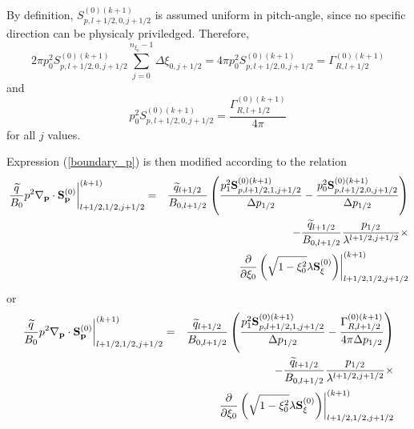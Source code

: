 By definition, $S_{p,l+1/2,0,j+1/2}^{\left( 0\right) \left( k+1\right) }$ is
assumed uniform in pitch-angle, since no specific direction can be physicaly
priviledged. Therefore,
\begin{equation}
2\pi p_{0}^{2}S_{p,l+1/2,0,j+1/2}^{\left( 0\right) \left( k+1\right)
}\sum_{j=0}^{n_{\xi _{0}}-1}\Delta \xi _{0,j+1/2}=4\pi
p_{0}^{2}S_{p,l+1/2,0,j+1/2}^{\left( 0\right) \left( k+1\right) }=\Gamma
_{R,l+1/2}^{\left( 0\right) \left( k+1\right) }
\end{equation}
and
\begin{equation}
p_{0}^{2}S_{p,l+1/2,0,j+1/2}^{\left( 0\right) \left( k+1\right) }=\frac{
\Gamma _{R,l+1/2}^{\left( 0\right) \left( k+1\right) }}{4\pi }
\end{equation}
for all $j$ values.

Expression (\ref{boundary_p}) is then modified according to the relation
\begin{eqnarray}
\left. \frac{\widetilde{q}}{B_{0}}p^{2}\nabla _{\mathbf{p}}\cdot \mathbf{S}_{%
\mathbf{p}}^{\left( 0\right) }\right| _{l+1/2,1/2,j+1/2}^{(k+1)} &=&\frac{%
\widetilde{q}_{l+1/2}}{B_{0,l+1/2}}\left( \frac{p_{1}^{2}\mathbf{S}%
_{p,l+1/2,1,j+1/2}^{\left( 0\right) (k+1)}}{\Delta p_{1/2}}-\frac{p_{0}^{2}%
\mathbf{S}_{p,l+1/2,0,j+1/2}^{\left( 0\right) (k+1)}}{\Delta p_{1/2}}\right)
\nonumber \\
&&-\frac{\widetilde{q}_{l+1/2}}{B_{0,l+1/2}}\frac{p_{1/2}}{\lambda
^{l+1/2,j+1/2}}\times   \nonumber \\
&&\left. \frac{\partial }{\partial \xi _{0}}\left( \sqrt{1-\xi _{0}^{2}}%
\lambda \mathbf{S}_{\xi }^{\left( 0\right) }\right) \right|
_{l+1/2,1/2,j+1/2}^{(k+1)}
\end{eqnarray}
or
\begin{eqnarray}
\left. \frac{\widetilde{q}}{B_{0}}p^{2}\nabla _{\mathbf{p}}\cdot \mathbf{S}_{%
\mathbf{p}}^{\left( 0\right) }\right| _{l+1/2,1/2,j+1/2}^{(k+1)} &=&\frac{%
\widetilde{q}_{l+1/2}}{B_{0,l+1/2}}\left( \frac{p_{1}^{2}\mathbf{S}%
_{p,l+1/2,1,j+1/2}^{\left( 0\right) (k+1)}}{\Delta p_{1/2}}-\frac{\Gamma
_{R,l+1/2}^{\left( 0\right) (k+1)}}{4\pi \Delta p_{1/2}}\right)   \nonumber
\\
&&-\frac{\widetilde{q}_{l+1/2}}{B_{0,l+1/2}}\frac{p_{1/2}}{\lambda
^{l+1/2,j+1/2}}\times   \nonumber \\
&&\left. \frac{\partial }{\partial \xi _{0}}\left( \sqrt{1-\xi _{0}^{2}}%
\lambda \mathbf{S}_{\xi }^{\left( 0\right) }\right) \right|
_{l+1/2,1/2,j+1/2}^{(k+1)}
\end{eqnarray}

